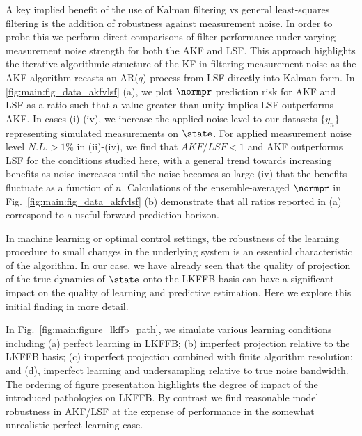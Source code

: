 A key implied benefit of the use of Kalman filtering vs general least-squares filtering is the addition of robustness against measurement noise.  In order to probe this we perform direct comparisons of filter performance under varying measurement noise strength for both the AKF and LSF.  This approach highlights the iterative algorithmic structure of the KF in filtering measurement noise as the AKF algorithm recasts an AR($q$) process from LSF directly into Kalman form.  In \cref{fig:main:fig_data_akfvlsf} (a), we plot $\normpr$ prediction risk for AKF and LSF as a ratio such that a value greater than unity implies LSF outperforms AKF.
In cases (i)-(iv), we increase the applied noise level to our datasets $\{ y_n \}$ representing simulated measurements on $\state$. For applied measurement noise level $N.L. > 1\%$ in (ii)-(iv), we find that $AKF/LSF <1 $ and AKF outperforms LSF for the conditions studied here, with a general trend towards increasing benefits as noise increases until the noise becomes so large (iv) that the benefits fluctuate as a function of $n$. Calculations of the ensemble-averaged $\normpr$ in Fig.~\ref{fig:main:fig_data_akfvlsf} (b) demonstrate that all ratios reported in (a) correspond to a useful forward prediction horizon. 





In machine learning or optimal control settings, the robustness of the learning procedure to small changes in the underlying system is an essential characteristic of the algorithm.  In our case, we have already seen that the quality of projection of the true dynamics of $\state$ onto the LKFFB basis can have a significant impact on the quality of learning and predictive estimation.  Here we explore this initial finding in more detail.  

 In Fig.~\ref{fig:main:figure_lkffb_path}, we simulate various learning conditions including (a) perfect learning in LKFFB; (b) imperfect projection relative to the LKFFB basis; (c) imperfect projection combined with finite algorithm resolution; and (d), imperfect learning and undersampling relative to true noise bandwidth. The ordering of figure presentation highlights the degree of impact of the introduced pathologies on LKFFB.  By contrast we find reasonable model robustness in AKF/LSF at the expense of performance in the somewhat unrealistic perfect learning case.  

